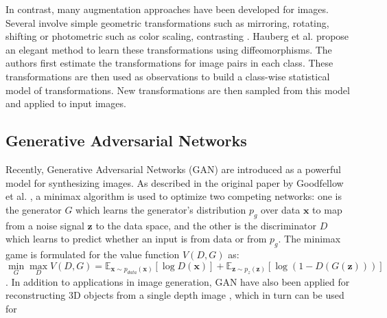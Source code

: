 In contrast, many augmentation approaches have been developed for images. Several involve simple geometric
transformations such as mirroring, rotating, shifting \cite{Gu2018} or photometric such as color scaling, contrasting
\cite{Eigen2015}. Hauberg et al. \cite{Hauberg2016Diffeomorphism} propose an elegant method to learn these
transformations using diffeomorphisms. The authors first estimate the transformations for image pairs in each class.
These transformations are then used as observations to build a class-wise statistical model of transformations.
New transformations are then sampled from this model and applied to input images.

\subsection{Generative Adversarial Networks}

Recently, Generative Adversarial Networks (GAN) are introduced as a powerful model for synthesizing images. As described
in the original paper by Goodfellow et al. \cite{Goodfellow2014GAN}, a minimax algorithm is used to optimize two
competing networks: one is the generator $ G $ which learns the generator's distribution $ p_g $ over data
$ \boldsymbol{x} $ to map from a noise signal $ \boldsymbol{z} $ to the data space, and the other is the discriminator
$ D $ which learns to predict whether an input is from data or from $ p_g $. The minimax game is formulated for the
value function $ V(D,G) $ as:
\begin{equation} \label{eq:gan}
    \min_G \max_D V(D,G) =
        \mathbb{E}_{\boldsymbol{x} \sim p_{data}(\boldsymbol{x})}\left[ \log D(\boldsymbol{x}) \right]
        + \mathbb{E}_{\boldsymbol{z} \sim p_{z}(\boldsymbol{z})}\left[ \log(1 - D(G(\boldsymbol{z}))) \right]
\end{equation}
. In addition to applications in image generation, GAN have also been applied for reconstructing 3D objects from a
single depth image \cite{Yang2017}, which in turn can be used for 
